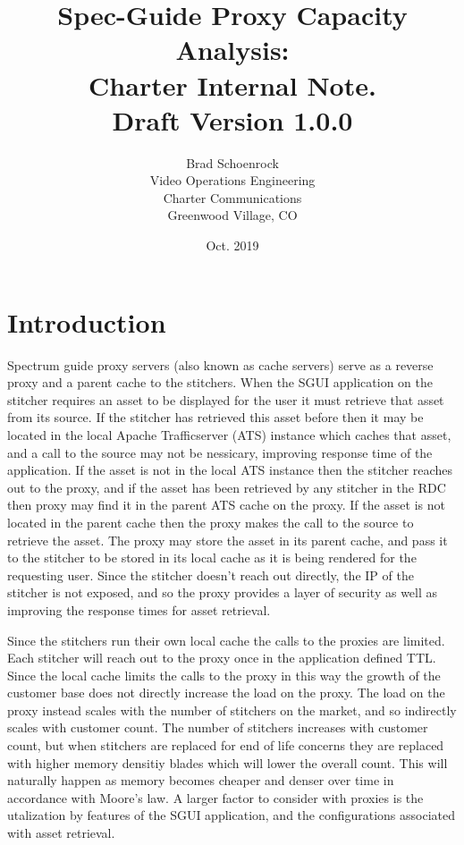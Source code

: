 \documentclass{article}
\author{Brad Schoenrock\\Video Operations Engineering\\Charter Communications\\Greenwood Village, CO}
\title{Spec-Guide Proxy Capacity Analysis:\\Charter Internal Note.\\Draft Version 1.0.0}
\date{Oct. 2019}
\begin{document}
\maketitle
\newpage

\tableofcontents
\newpage



\section{Introduction}
\label{SECTION-Introduction}

Spectrum guide proxy servers (also known as cache servers) serve as a reverse proxy and a parent cache to the stitchers. When the SGUI application on the stitcher requires an asset to be displayed for the user it must retrieve that asset from its source. If the stitcher has retrieved this asset before then it may be located in the local Apache Trafficserver (ATS) instance which caches that asset, and a call to the source may not be nessicary, improving response time of the application. If the asset is not in the local ATS instance then the stitcher reaches out to the proxy, and if the asset has been retrieved by any stitcher in the RDC then proxy may find it in the parent ATS cache on the proxy. If the asset is not located in the parent cache then the proxy makes the call to the source to retrieve the asset. The proxy may store the asset in its parent cache, and pass it to the stitcher to be stored in its local cache as it is being rendered for the requesting user. Since the stitcher doesn't reach out directly, the IP of the stitcher is not exposed, and so the proxy provides a layer of security as well as improving the response times for asset retrieval. 

Since the stitchers run their own local cache the calls to the proxies are limited. Each stitcher will reach out to the proxy once in the application defined TTL. Since the local cache limits the calls to the proxy in this way the growth of the customer base does not directly increase the load on the proxy. The load on the proxy instead scales with the number of stitchers on the market, and so indirectly scales with customer count. The number of stitchers increases with customer count, but when stitchers are replaced for end of life concerns they are replaced with higher memory densitiy blades which will lower the overall count. This will naturally happen as memory becomes cheaper and denser over time in accordance with Moore's law. A larger factor to consider with proxies is the utalization by features of the SGUI application, and the configurations associated with asset retrieval. 
\end{document}
